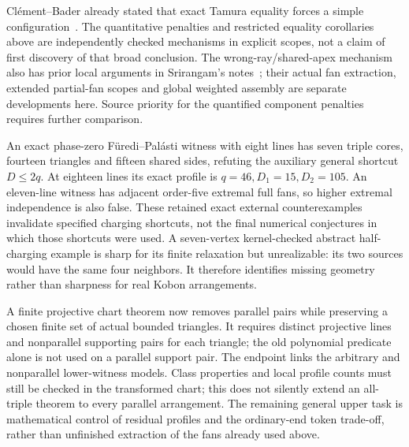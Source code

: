 Cl\'ement--Bader already stated that exact Tamura equality forces a
simple configuration~\cite{clementbader2007}. The quantitative penalties
and restricted equality corollaries above are independently checked
mechanisms in explicit scopes, not a claim of first discovery of that
broad conclusion. The wrong-ray/shared-apex mechanism also has prior local
arguments in Srirangam's notes~\cite{srirangam2026}; their actual fan
extraction, extended partial-fan scopes and global weighted assembly are
separate developments here. Source priority for the quantified component
penalties requires further comparison.

An exact phase-zero F\"uredi--Pal\'asti witness with eight lines has seven
triple cores, fourteen triangles and fifteen shared sides, refuting the
auxiliary general shortcut $D\le2q$. At eighteen lines its exact profile
is $q=46,D_1=15,D_2=105$. An eleven-line witness has adjacent order-five
extremal full fans, so higher extremal independence is also false.
These retained exact external counterexamples invalidate specified
charging shortcuts, not the final numerical conjectures in which those
shortcuts were used. A seven-vertex kernel-checked abstract half-charging
example is sharp for its finite relaxation but unrealizable: its two
sources would have the same four neighbors. It therefore identifies
missing geometry rather than sharpness for real Kobon arrangements.

A finite projective chart theorem now removes parallel pairs while
preserving a chosen finite set of actual bounded triangles. It requires
distinct projective lines and nonparallel supporting pairs for each
triangle; the old polynomial predicate alone is not used on a parallel
support pair. The endpoint
links the arbitrary and nonparallel lower-witness models. Class properties
and local profile counts must still be checked in the transformed chart;
this does not silently extend an all-triple theorem to every parallel
arrangement. The remaining general upper task is mathematical control
of residual profiles and the ordinary-end token trade-off, rather than
unfinished extraction of the fans already used above.
